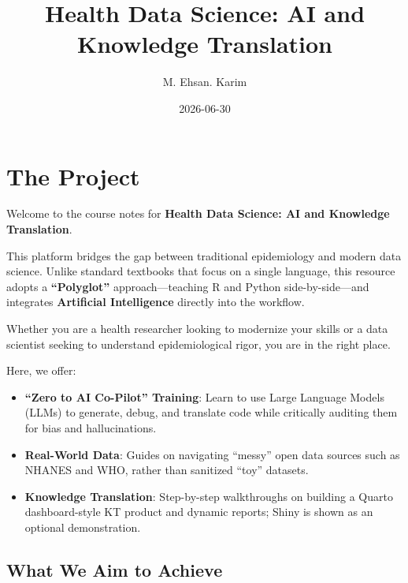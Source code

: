 \documentclass[
  letterpaper,
  DIV=11,
  numbers=noendperiod,
  oneside]{scrreprt}
\title{Health Data Science: AI and Knowledge Translation}
\author{M. Ehsan. Karim}
\date{2026-06-30}
\providecommand{\tightlist}{%
  \setlength{\itemsep}{0pt}\setlength{\parskip}{0pt}}
\renewcommand*\contentsname{Table of contents}
\newcommand\contentsname{Table of contents}
\begin{document}
\maketitle

\renewcommand*\contentsname{Table of contents}
{
\hypersetup{linkcolor=}
\setcounter{tocdepth}{1}
\tableofcontents
}


\chapter*{The Project}\label{the-project}


Welcome to the course notes for \textbf{Health Data Science: AI and
Knowledge Translation}.

This platform bridges the gap between traditional epidemiology and
modern data science. Unlike standard textbooks that focus on a single
language, this resource adopts a \textbf{``Polyglot''}
approach---teaching R and Python side-by-side---and integrates
\textbf{Artificial Intelligence} directly into the workflow.

Whether you are a health researcher looking to modernize your skills or
a data scientist seeking to understand epidemiological rigor, you are in
the right place.

Here, we offer:

\begin{itemize}
\tightlist
\item
  \textbf{``Zero to AI Co-Pilot'' Training}: Learn to use Large Language
  Models (LLMs) to generate, debug, and translate code while critically
  auditing them for bias and hallucinations.
\item
  \textbf{Real-World Data}: Guides on navigating ``messy'' open data
  sources such as NHANES and WHO, rather than sanitized ``toy''
  datasets.
\item
  \textbf{Knowledge Translation}: Step-by-step walkthroughs on building
  a Quarto dashboard-style KT product and dynamic reports; Shiny is
  shown as an optional demonstration.
\end{itemize}

\section*{What We Aim to Achieve}\label{what-we-aim-to-achieve}
\end{document}
